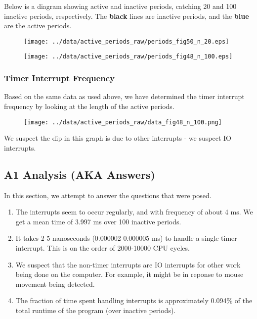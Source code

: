 \documentclass[a4paper, 12pt]{article}
\begin{document}
Below is a diagram showing active and inactive periods, catching 20 and 100 inactive periods, respectively. The \textbf{black} lines are inactive periods, and the \textbf{blue} are the active periods.

\begin{figure}[H]
    \centering
        \texttt{[image: ../data/active\_periods\_raw/periods\_fig50\_n\_20.eps]}
\end{figure}

\begin{figure}[H]
    \centering
        \texttt{[image: ../data/active\_periods\_raw/periods\_fig48\_n\_100.eps]}
\end{figure}

\subsubsection{Timer Interrupt Frequency}

Based on the same data as used above, we have determined the timer interrupt frequency by looking at the length of the active periods.

\begin{figure}[H]
    \centering
        \texttt{[image: ../data/active\_periods\_raw/data\_fig48\_n\_100.png]}
\end{figure}

We suspect the dip in this graph is due to other interrupts - we suspect IO interrupts.

\subsection{A1 Analysis (AKA Answers)}

In this section, we attempt to answer the questions that were posed.

\begin{enumerate}
\item   The interrupts seem to occur regularly, and with frequency of about 4 ms. We get a mean time of 3.997 ms over 100 inactive periods.
\item   It takes 2-5 nanoseconds (0.000002-0.000005 ms) to handle a single timer interrupt. This is on the order of 2000-10000 CPU cycles.
\item   We suspect that the non-timer interrupts are IO interrupts for other work being done on the computer. For example, it might be in reponse to mouse movement being detected.
\item   The fraction of time spent handling interrupts is approximately 0.094\% of the total runtime of the program (over inactive periods).
\end{enumerate}
\end{document}

